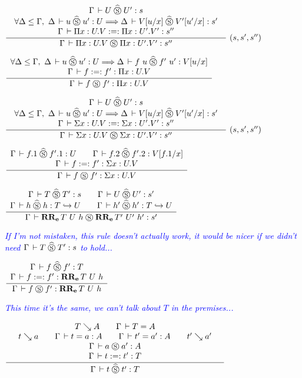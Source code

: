 \documentclass[a4paper,english]{lipics-utf8x}
\newcommand\meta[1]{\noindent\textcolor{blue}{\emph{#1}}}
\begin{document}
  \begin{center}
  \(
    \trux{\Gamma \der U \hSr U' : s
        }{\forall \Delta \le \Gamma,\ \Delta \der u \hSr u' : U \gives
          \Delta \der V[u/x] \hSr V'[u'/x] : s'
        }{\Gamma \der \Pi x:U.V :=: \Pi x:U'.V' : s''
        }{\Gamma \der \Pi x:U.V \Sr \Pi x:U'.V' : s''
        }{(s,s',s'')}
  \)
  \end{center}

  \begin{center}
  \(
    \dru{\forall \Delta \le \Gamma,\ \Delta \der u \hSr u' : U \gives
         \Delta \der f~u \hSr f'~u' : V[u/x]
       }{\Gamma \der f :=: f' : \Pi x:U.V
       }{\Gamma \der f \Sr f' : \Pi x:U.V}
  \)
  \end{center}

  \begin{center}
  \(
    \trux{\Gamma \der U \hSr U' : s
        }{\forall \Delta \le \Gamma,\ \Delta \der u \hSr u' : U \gives
          \Delta \der V[u/x] \hSr V'[u'/x] : s'
        }{\Gamma \der \Sigma x:U.V :=: \Sigma x:U'.V' : s''
        }{\Gamma \der \Sigma x:U.V \Sr \Sigma x:U'.V' : s''
        }{(s,s',s'')}
  \)
  \end{center}

  \begin{center}
  \(
    \dru{\Gamma \der f.1 \hSr f'.1 : U \qquad
         \Gamma \der f.2 \hSr f'.2 : V[f.1/x]
       }{\Gamma \der f :=: f' : \Sigma x:U.V
       }{\Gamma \der f \Sr f' : \Sigma x:U.V}
  \)
  \end{center}

  \begin{center}
  \(
    \dru{\Gamma \der T \hSr T' : s \qquad
         \Gamma \der U \hSr U' : s'
       }{\Gamma \der h \hSr h : \emb{T}{U} \qquad
         \Gamma \der h' \hSr h' : \emb{T}{U}
       }{\Gamma \der \RRe{T}{U}{h} \Sr \RRe{T'}{U'}{h'} : s'}
  \)
  \end{center}

  \meta{If I'm not mistaken, this rule doesn't actually work, it would be nicer
  if we didn't need $\Gamma \,\vdash T \mathrel{\widehat{\mathrel{\circledS}}} T' : s$ to hold...}

  \begin{center}
  \(
    \dru{\Gamma \der f \hSr f' : T
       }{\Gamma \der f :=: f' : \RRe{T}{U}{h}
       }{\Gamma \der f \Sr f' : \RRe{T}{U}{h}}
  \)
  \end{center}

  \meta{This time it's the same, we can't talk about $T$ in the premises...}

  \begin{center}
  \(
    \qru{T \rew A \qquad
         \Gamma \der T = A
       }{t \rew a \qquad
         \Gamma \der t = a : A \qquad
         \Gamma \der t' = a' : A \qquad
         t' \rew a'
       }{\Gamma \der a \Sr a' : A
       }{\Gamma \der t :=: t' : T
       }{\Gamma \der t \hSr t' : T}
  \)
  \end{center}
\end{document}
